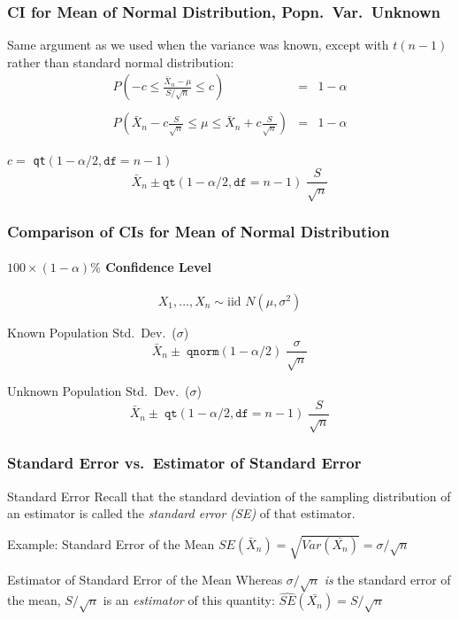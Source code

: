 \documentclass{beamer}
\begin{document}
\begin{frame}
\frametitle{CI for Mean of Normal Distribution, Popn.\ Var.\ Unknown}
Same argument as we used when the variance was known, except with $t(n-1)$ rather than standard normal distribution:
	\begin{eqnarray*}
		P\left(-c \leq \frac{\bar{X}_n-\mu}{S/\sqrt{n}} \leq c \right) &=& 1-\alpha \\ \\ 
		P\left(\bar{X}_n - c \frac{S}{\sqrt{n}} \leq \mu\leq \bar{X}_n +c \frac{S}{\sqrt{n}} \right) &=& 1-\alpha 
	\end{eqnarray*}

\alert{$c =$ \texttt{qt}$(1-\alpha/2, \texttt{df} = n-1)$} 
	$$\boxed{\bar{X}_n \pm \texttt{qt}(1-\alpha/2, \texttt{df} = n-1)\;  \frac{S}{\sqrt{n}}}$$
\end{frame}

\begin{frame}
\frametitle{Comparison of CIs for Mean of Normal Distribution}
\framesubtitle{$100\times(1-\alpha)\%$ Confidence Level}
$$\boxed{X_1, \hdots, X_n \sim \mbox{iid } N(\mu, \sigma^2)}$$


\begin{block}{Known Population Std.\ Dev.\ ($\sigma$)}
	$$\bar{X}_n \pm \; \texttt{qnorm}(1-\alpha/2) \; \frac{\sigma}{\sqrt{n}}$$
\end{block}


\begin{block}{Unknown Population Std.\ Dev.\ ($\sigma$)}
$$\bar{X}_n \pm \; \texttt{qt}(1-\alpha/2, \texttt{df} = n-1) \; \frac{S}{\sqrt{n}}$$
\end{block}
\end{frame}

\begin{frame}
\frametitle{Standard Error vs.\ Estimator of Standard Error}
\begin{block}{Standard Error}
Recall that the standard deviation of  the sampling distribution of an estimator is called the \emph{\alert{standard error} (SE)} of that estimator.
\end{block}
\begin{block}{Example: Standard Error of the Mean}
$SE(\bar{X}_n) = \sqrt{Var\left(\bar{X_n}\right)} = \sigma/\sqrt{n}$
\end{block}



\begin{alertblock}{Estimator of Standard Error of the Mean} Whereas $\sigma/\sqrt{n}$ \alert{\emph{is}} the standard error of the mean, $S/\sqrt{n}$ is an \alert{\emph{estimator}} of this quantity: $\widehat{SE}(\bar{X_n}) = S/\sqrt{n}$
\end{alertblock}
\end{frame}
\end{document}
